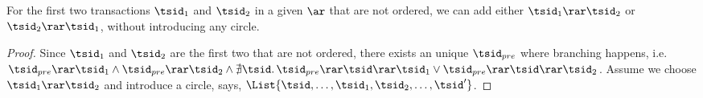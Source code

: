 \begin{lem}
    For the first two transactions \( \tsid_{1} \) and \( \tsid_{2} \) in a given \( \ar \) that are not ordered, we can add either \( \tsid_{1} \rar \tsid_{2} \) or \( \tsid_{2} \rar \tsid_{1} \), without introducing any circle.
\end{lem}
\begin{proof}
    Since \( \tsid_{1} \) and \( \tsid_{2} \) are the first two that are not ordered, there exists an unique \( \tsid_{pre} \) where branching happens, i.e.\ \( \tsid_{pre} \rar \tsid_{1} \land \tsid_{pre} \rar \tsid_{2} \land \nexists \tsid \ldotp \tsid_{pre} \rar \tsid \rar \tsid_{1} \lor \tsid_{pre} \rar \tsid \rar \tsid_{2} \).
    Assume we choose \( \tsid_{1} \rar \tsid_{2} \) and introduce a circle, says, \( \List{\tsid, \dots, \tsid_{1}, \tsid_{2}, \dots, \tsid' } \).
\end{proof}
